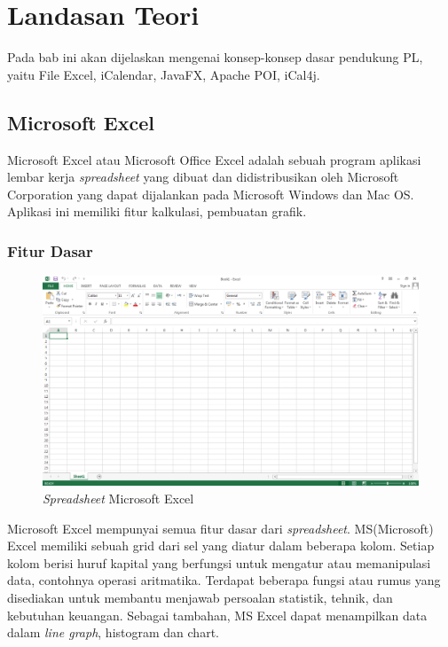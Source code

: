 \chapter{Landasan Teori}
\label{chap:teori}
Pada bab ini akan dijelaskan mengenai konsep-konsep dasar pendukung PL, yaitu File Excel, iCalendar, JavaFX, Apache POI, iCal4j.

\section{Microsoft Excel}
\label{sec:excel}
Microsoft Excel atau Microsoft Office Excel adalah sebuah program aplikasi lembar kerja \textit{spreadsheet} yang dibuat dan didistribusikan oleh Microsoft Corporation yang dapat dijalankan pada Microsoft Windows dan Mac OS. Aplikasi ini memiliki fitur kalkulasi, pembuatan grafik.\cite{excel}

\subsection{Fitur Dasar}
\begin{figure}[H]
	\centering
	\includegraphics[scale=0.5]{Gambar/msExcel}
	\caption{\textit{Spreadsheet} Microsoft Excel}
\end{figure}
Microsoft Excel mempunyai semua fitur dasar dari \textit{spreadsheet}. MS(Microsoft) Excel memiliki sebuah grid dari sel yang diatur dalam beberapa kolom. Setiap kolom berisi huruf kapital yang berfungsi untuk mengatur atau memanipulasi data, contohnya operasi aritmatika. Terdapat beberapa fungsi atau rumus yang disediakan untuk membantu menjawab persoalan statistik, tehnik, dan kebutuhan keuangan. Sebagai tambahan, MS Excel dapat menampilkan data dalam \textit{line graph}, histogram dan chart.\cite{excel}

